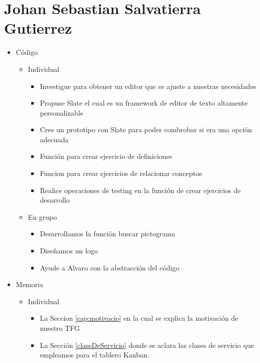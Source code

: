 \section{Johan Sebastian Salvatierra Gutierrez}
\begin{itemize}
    \item Código
          \begin{itemize}
              \item Individual
                    \begin{itemize}
                        \item Investigue para obtener un editor que se ajuste a nuestras necesidades
                        \item Propuse Slate el cual es un framework de editor de texto altamente personalizable
                        \item Cree un prototipo con Slate para poder combrobar si era una opción adecuada
                        \item Función para crear ejercicio de definiciones
                        \item Funcion para crear ejercicios de relacionar conceptos
                        \item Realice operaciones de testing en la función de crear ejercicios de desarrollo
                    \end{itemize}
              \item En grupo
                    \begin{itemize}
                        \item Desarrollamos la función buscar pictograma
                        \item Diseñamos un logo
                        \item Ayude a Alvaro con la abstracción del código
                    \end{itemize}
          \end{itemize}
    \item Memoria
          \begin{itemize}
              \item Individual
                    \begin{itemize}
                        \item La Seccion \ref{cap:motivacio} en la cual se explica la motivación de nuestro TFG
                        \item La Sección \ref{claseDeServicio} donde se aclara las clases de servicio que empleamos para el tablero Kanban.

\end{itemize}
\end{itemize}
\end{itemize}
